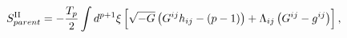 \begin{equation}
S^{{\rm II}}_{parent}=-\frac{T_p}{2}\int d^{p+1}{\xi}\left[\sqrt{-G}
\left(G^{ij}h_{ij}-(p-1)\right)+{\Lambda}_{ij}\left(G^{ij}-g^{ij}\right)
\right],
\end{equation}

